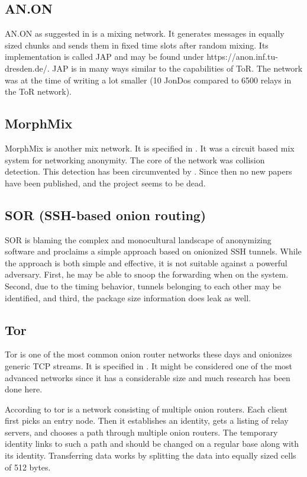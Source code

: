 \subsection{AN.ON}
AN.ON as suggested in \cite{federrath2003system} is a mixing network. It generates messages in equally sized chunks and sends them in fixed time slots after random mixing. Its implementation is called JAP and may be found under https://anon.inf.tu-dresden.de/. JAP is in many ways similar to the capabilities of ToR. The network was at the time of writing a lot smaller (10 JonDos compared to 6500 relays in the ToR network).

\subsection{MorphMix}
MorphMix is another mix network. It is specified in \cite{morphmix:wpes2002}. It was a circuit based mix system for networking anonymity. The core of the network was collision detection. This detection has been circumvented by \cite{morphmix:pet2006}. Since then no new papers have been published, and the project seems to be dead.

\subsection{SOR (SSH-based onion routing)}
SOR \cite{Egners_2012} is blaming the complex and monocultural landscape of anonymizing software and proclaims a simple approach based on onionized SSH tunnels. While the approach is both simple and effective, it is not suitable against a powerful adversary. First, he may be able to snoop the forwarding when on the system. Second, due to the timing behavior, tunnels belonging to each other may be identified, and third, the package size information does leak as well.

\subsection{Tor\label{sec:tor}}
Tor is one of the most common onion router networks these days and onionizes generic TCP streams. It is specified in \cite{tor-spec}. It might be considered one of the most advanced networks since it has a considerable size and much research has been done here.

According to \cite{onion-routing:pet2000} tor is a network consisting of multiple onion routers. Each client first picks an entry node. Then it establishes an identity, gets a listing of relay servers, and chooses a path through multiple onion routers. The temporary identity links to such a path and should be changed on a regular base along with its identity. Transferring data works by splitting the data into equally sized cells of 512 bytes.

